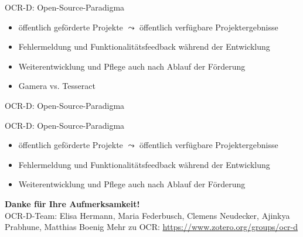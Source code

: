 \documentclass{bbawslides}
\begin{document}
\begin{bbawslide}{OCR-D: Open-Source-Paradigma}
  \vspace*{7mm}%
  \centerslidestrue%
  \begin{itemize}
    \item öffentlich geförderte Projekte $\leadsto$ öffentlich verfügbare Projektergebnisse
    \item Fehlermeldung und Funktionalitätsfeedback während der Entwicklung
    \item Weiterentwicklung und Pflege auch nach Ablauf der Förderung
    \item Gamera vs. Tesseract
  \end{itemize}
\end{bbawslide}

\begin{bbawslide}{OCR-D: Open-Source-Paradigma}
  \vspace*{2mm}%
  \begin{center}
  \end{center}
\end{bbawslide}

\begin{bbawslide}{OCR-D: Open-Source-Paradigma}
  \vspace*{7mm}%
  \centerslidestrue%
  \begin{itemize}
    \item öffentlich geförderte Projekte $\leadsto$ öffentlich verfügbare Projektergebnisse
    \item Fehlermeldung und Funktionalitätsfeedback während der Entwicklung
    \item Weiterentwicklung und Pflege auch nach Ablauf der Förderung
  \end{itemize}
\end{bbawslide}

\begin{bbawpart}{\Large\bf Danke für Ihre Aufmerksamkeit!\\}
OCR-D-Team: Elisa Hermann, Maria Federbusch, Clemens Neudecker, Ajinkya Prabhune, Matthias Boenig
Mehr zu OCR: \url{https://www.zotero.org/groups/ocr-d}
\end{bbawpart}
\end{document}
